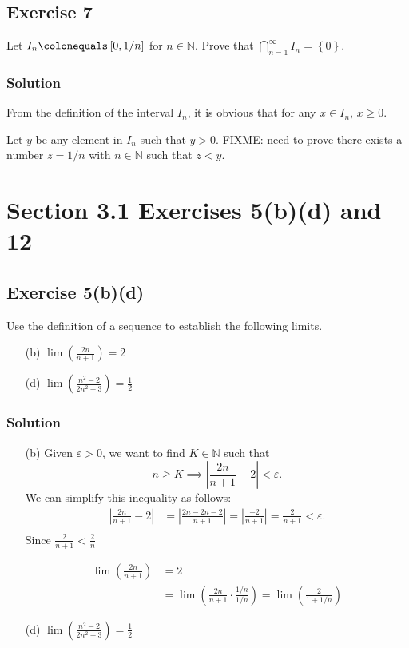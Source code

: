 \documentclass[12pt]{article}
\begin{document}
\subsection*{Exercise 7}
Let $I_n \colonequals \left[0, 1/n\right]$ for $n \in \mathbb{N}$. Prove that $\bigcap_{n = 1}^\infty I_n = \left\{0\right\}$.

\subsubsection*{Solution}
From the definition of the interval $I_n$, it is obvious that for any $x \in I_n$, $x \geq 0$.

Let $y$ be any element in $I_n$ such that $y > 0$. FIXME: need to prove there exists a number $z = 1/n$ with $n \in \mathbb{N}$ such that $z < y$.

\section*{Section 3.1 Exercises 5(b)(d) and 12}

\subsection*{Exercise 5(b)(d)}
Use the definition of a sequence to establish the following limits.
\begin{itemize}
\item[(b)]$\displaystyle\lim\left(\frac{2n}{n + 1}\right) = 2$
\item[(d)]$\displaystyle\lim\left(\frac{n^2 - 2}{2n^2 + 3}\right) = \frac{1}{2}$
\end{itemize}

\subsubsection*{Solution}
\begin{itemize}
\item[(b)]
Given $\varepsilon > 0$, we want to find $K \in \mathbb{N}$ such that
\begin{equation*}
n \geq K \implies \left|\frac{2n}{n + 1} - 2\right| < \varepsilon \text{.}
\end{equation*}
We can simplify this inequality as follows:
\begin{align*}
\left|\frac{2n}{n + 1} - 2\right| &= \left|\frac{2n - 2n - 2}{n + 1}\right| = \left|\frac{-2}{n + 1}\right| = \frac{2}{n + 1} < \varepsilon\text{.}\\
\end{align*}
Since $\frac{2}{n + 1} < \frac{2}{n}$

\begin{align*}
\lim\left(\frac{2n}{n + 1}\right) &= 2\\
&= \lim\left(\frac{2n}{n + 1} \cdot \frac{1/n}{1/n}\right) = \lim\left(\frac{2}{1 + 1/n}\right)
\end{align*}

\item[(d)]$\displaystyle\lim\left(\frac{n^2 - 2}{2n^2 + 3}\right) = \frac{1}{2}$

\end{itemize}
\end{document}
